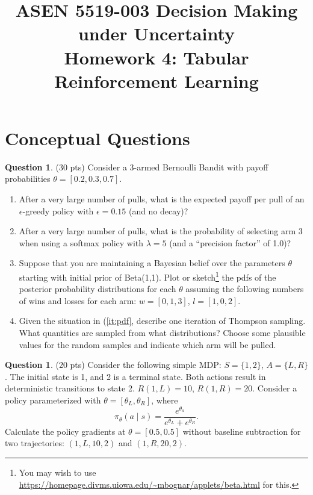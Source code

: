 \documentclass{article}
\title{ASEN 5519-003 Decision Making under Uncertainty\\
       Homework 4: Tabular Reinforcement Learning}
\theoremstyle{definition}
\newtheorem{question}[thm]{Question}
\begin{document}
\maketitle

\section{Conceptual Questions}

\begin{question}
    (30 pts) Consider a 3-armed Bernoulli Bandit with payoff probabilities $\theta = [0.2, 0.3, 0.7]$.
    \begin{enumerate}[label=\alph*),noitemsep]
        \item After a very large number of pulls, what is the expected payoff per pull of an $\epsilon$-greedy policy with $\epsilon=0.15$ (and no decay)?
        \item After a very large number of pulls, what is the probability of selecting arm 3 when using a softmax policy with $\lambda=5$ (and a ``precision factor'' of 1.0)?
        \item Suppose that you are maintaining a Bayesian belief over the parameters $\theta$ starting with initial prior of Beta(1,1). Plot or sketch\footnote{You may wish to use \url{https://homepage.divms.uiowa.edu/~mbognar/applets/beta.html} for this.} the pdfs of the posterior probability distributions for each $\theta$ assuming the following numbers of wins and losses for each arm: $w = [0, 1, 3]$, $l = [1, 0, 2]$.\label{it:pdf}
        \item Given the situation in (\ref{it:pdf}, describe one iteration of Thompson sampling. What quantities are sampled from what distributions? Choose some plausible values for the random samples and indicate which arm will be pulled.
    \end{enumerate}
\end{question}

\begin{question}
    (20 pts) Consider the following simple MDP: $S = \{1,2\}$, $A = \{L,R\}$. The initial state is 1, and 2 is a terminal state. Both actions result in deterministic transitions to state 2. $R(1,L) = 10$, $R(1,R) = 20$. Consider a policy parameterized with $\theta = [\theta_L, \theta_R]$, where $$\pi_\theta (a \mid s) = \frac{e^{\theta_a}}{e^{\theta_L} + e^{\theta_R}} \text{.}$$ Calculate the policy gradients at $\theta = [0.5, 0.5]$ without baseline subtraction for two trajectories: $(1,L,10,2)$ and $(1,R,20,2)$.
\end{question}
\end{document}
